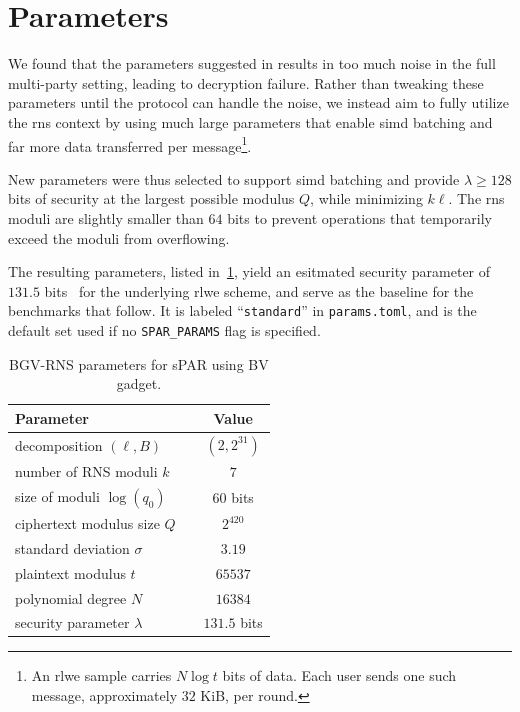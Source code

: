 \newcommand{\securityBits}{131.5}

\section{Parameters}
\label{sec:results:params}
We found that the parameters suggested in \cite{cryptoeprint:2025/860} results in too much noise in the full multi-party setting, leading to decryption failure. Rather than tweaking these parameters until the protocol can handle the noise, we instead aim to fully utilize the \gls{rns} context by using much large parameters that enable \gls{simd} batching and far more data transferred per message\footnote{An \gls{rlwe} sample carries $N\log{t}$ bits of data. Each user sends one such message, approximately $32$ KiB, per round.}.

New parameters were thus selected to support \gls{simd} batching and provide $\lambda \geq 128$ bits of security at the largest possible modulus $Q$, while minimizing $k\ell$. The \gls{rns} moduli are slightly smaller than $64$ bits to prevent operations that temporarily exceed the moduli from overflowing.

The resulting parameters, listed in~\cref{tab:bench:params}, yield an esitmated security parameter of $\securityBits$ bits~\cite{cryptoeprint:2015/046} for the underlying \gls{rlwe} scheme, and serve as the baseline for the benchmarks that follow. It is labeled ``\texttt{standard}'' in \texttt{params.toml}, and is the default set used if no \texttt{SPAR\_PARAMS} flag is specified.

\vspace{4pt}
\begin{table}[H]
    \caption{BGV-RNS parameters for sPAR using BV gadget.}
    \label{tab:bench:params}
    \centering
    \begin{tabular}{lcc}
        \toprule
        \textbf{Parameter}                      & & \textbf{Value}   \\
        \midrule
        decomposition $(\ell, B)$               & & $(2, 2^{31})$     \\
        number of RNS moduli $k$                & & $7$               \\
        size of moduli $\log{(q_0)}$            & & $60$ bits         \\
        ciphertext modulus size ${Q}$           & & $2^{420}$        \\
        standard deviation $\sigma$             & & $3.19$            \\
        plaintext modulus $t$                   & & $65537$           \\ %
        polynomial degree $N$                   & & $16384$           \\
        security parameter $\lambda$            & & $\securityBits$ bits  \\ 
        \bottomrule
    \end{tabular}
\end{table}

\vfill